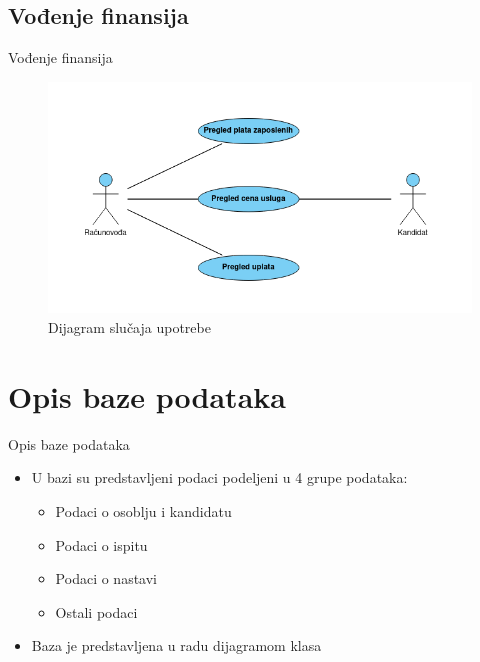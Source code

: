 \documentclass[compress, containsverbatim,mathserif, xcolor=dvipsnames, unicode]{beamer}
\begin{document}
\subsection{Vođenje finansija}
\begin{frame}{Vođenje finansija}
        \begin{figure}[h!]
        \begin{center}
          \includegraphics[scale = 0.45]{vodjenje_finansija.png}
        \end{center}
       \caption{Dijagram slučaja upotrebe}
    \end{figure}   
\end{frame}

\section{Opis baze podataka}
\begin{frame}{Opis baze podataka}
\vspace{\baselineskip}
\begin{itemize}
	\item U bazi su predstavljeni podaci podeljeni u 4 grupe podataka:
    \begin{itemize}
        \item Podaci o osoblju i kandidatu
        \item Podaci o ispitu
        \item Podaci o nastavi
        \item Ostali podaci
    \end{itemize}
    \item Baza je predstavljena u radu dijagramom klasa
   

\end{itemize}
\end{frame}
\end{document}

